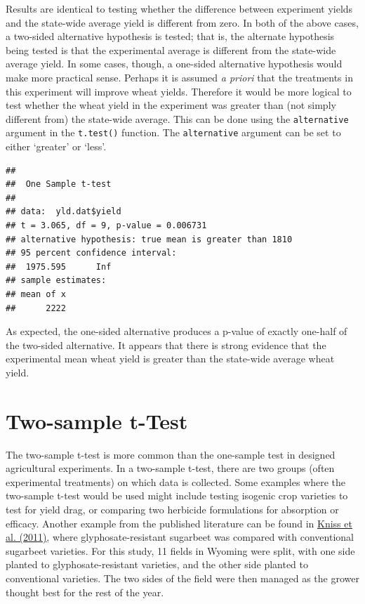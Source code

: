 \documentclass[letterpaper,]{book}
\newenvironment{Shaded}{\begin{snugshade}}{\end{snugshade}}
\newcommand{\DataTypeTok}[1]{\textcolor[rgb]{0.13,0.29,0.53}{#1}}
\newcommand{\DecValTok}[1]{\textcolor[rgb]{0.00,0.00,0.81}{#1}}
\newcommand{\KeywordTok}[1]{\textcolor[rgb]{0.13,0.29,0.53}{\textbf{#1}}}
\newcommand{\NormalTok}[1]{#1}
\newcommand{\OperatorTok}[1]{\textcolor[rgb]{0.81,0.36,0.00}{\textbf{#1}}}
\newcommand{\StringTok}[1]{\textcolor[rgb]{0.31,0.60,0.02}{#1}}
\begin{document}
Results are identical to testing whether the difference between experiment yields and the state-wide average yield is different from zero. In both of the above cases, a two-sided alternative hypothesis is tested; that is, the alternate hypothesis being tested is that the experimental average is different from the state-wide average yield. In some cases, though, a one-sided alternative hypothesis would make more practical sense. Perhaps it is assumed \emph{a priori} that the treatments in this experiment will improve wheat yields. Therefore it would be more logical to test whether the wheat yield in the experiment was greater than (not simply different from) the state-wide average. This can be done using the \texttt{alternative} argument in the \texttt{t.test()} function. The \texttt{alternative} argument can be set to either `greater' or `less'.

\begin{Shaded}
\end{Shaded}

\begin{verbatim}
## 
##  One Sample t-test
## 
## data:  yld.dat$yield
## t = 3.065, df = 9, p-value = 0.006731
## alternative hypothesis: true mean is greater than 1810
## 95 percent confidence interval:
##  1975.595      Inf
## sample estimates:
## mean of x 
##      2222
\end{verbatim}

As expected, the one-sided alternative produces a p-value of exactly one-half of the two-sided alternative. It appears that there is strong evidence that the experimental mean wheat yield is greater than the state-wide average wheat yield.

\hypertarget{two-sample-t-test}{%
\section{Two-sample t-Test}\label{two-sample-t-test}}

The two-sample t-test is more common than the one-sample test in designed agricultural experiments. In a two-sample t-test, there are two groups (often experimental treatments) on which data is collected. Some examples where the two-sample t-test would be used might include testing isogenic crop varieties to test for yield drag, or comparing two herbicide formulations for absorption or efficacy. Another example from the published literature can be found in \href{http://assbt-jsbr.org/JSBR/Vol47/JSBRVol473and4p127to134CompasisonofConventionalandGlyphosate-ResistanSugarbeettheYarofCommercialInductioninWyoming.pdf}{Kniss et al. (2011)}, where glyphosate-resistant sugarbeet was compared with conventional sugarbeet varieties. For this study, 11 fields in Wyoming were split, with one side planted to glyphosate-resistant varieties, and the other side planted to conventional varieties. The two sides of the field were then managed as the grower thought best for the rest of the year.
\end{document}

